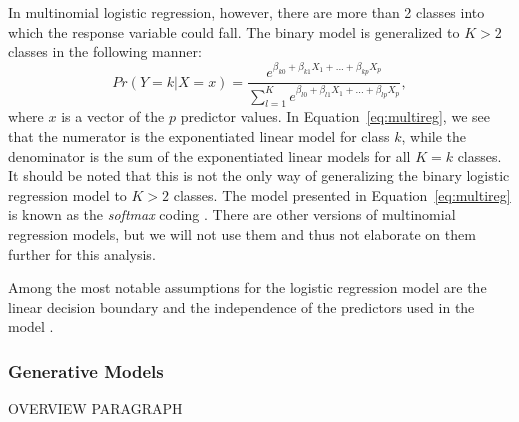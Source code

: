 \documentclass[12pt]{article}
\begin{document}
 In multinomial logistic regression, however, there are more than 2 classes 
 into which the response variable could fall.  The binary model is generalized 
 to $K > 2$ classes in the following manner:
 \begin{equation}
  \label{eq:multireg}
  Pr( Y = k | X = x ) = 
  \frac{e ^ {\beta_{k0} + \beta_{k1}X_1 + ... + \beta_{kp}X_p}}
  { \sum_{l = 1} ^ {K}  e ^ {\beta_{l0} + \beta_{l1}X_1 + ... + \beta_{lp}X_p}},
\end{equation}
where $x$ is a vector of the $p$ predictor values.  In 
Equation~\eqref{eq:multireg}, we see that the numerator is the exponentiated 
linear model for class $k$, while the denominator is the sum of the 
exponentiated linear models for all $K = k$ classes.  It should be noted 
that this is not the only way of generalizing the binary logistic regression 
model to $K >2$ classes.  The model presented in Equation~\eqref{eq:multireg} 
is known as the \textit{softmax} coding \citep{james2021introduction}.  
There are other versions of multinomial regression models, but we will not 
use them and thus not elaborate on them further for this analysis.  

Among the most notable assumptions for the logistic regression model are 
the linear decision boundary and the independence of the predictors used 
in the model \citep{khan2023comparison}.

\subsubsection{Generative Models}
\label{sec:gm}

OVERVIEW PARAGRAPH
\end{document}
